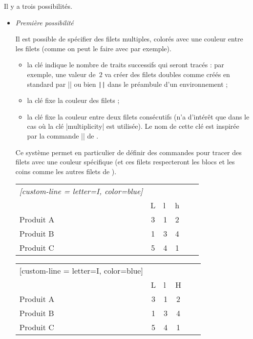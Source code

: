 \documentclass[dvipsnames]{article}%
\begin{document}
\bigskip
Il y a trois possibilités.


\begin{itemize}
\item \emph{Première possibilité}\par\nobreak

Il est possible de spécifier des filets multiples, colorés avec une couleur
entre les filets (comme on peut le faire avec  par exemple).

\begin{itemize}
\item la clé  indique le nombre de traits successifs
qui seront tracés : par exemple, une valeur de~$2$ va créer des filets doubles
comme créés en standard par |\hline\hline| ou bien \verb+||+ dans le préambule
d'un environnement ;

\item la clé  fixe la couleur des filets ;

\item la clé  fixe la couleur entre deux filets consécutifs (n'a
d'intérêt que dans le cas où la clé |multiplicity| est utilisée). Le nom de
cette clé est inspirée par la commande |\doublerulesepcolor| de .
\end{itemize}

\medskip
Ce système permet en particulier de définir des commandes pour tracer des filets
avec une couleur spécifique (et ces filets respecteront les blocs et les coins
comme les autres filets de ).

\medskip
\begin{Code}
\begin{NiceTabular}{lcIcIc}\emph{[custom-line = {letter=I, color=blue}]}
\hline
          &  \\
          & L & l & h \\
\hline
Produit A & 3 & 1 & 2 \\
Produit B & 1 & 3 & 4 \\
Produit C & 5 & 4 & 1 \\
\hline
\end{NiceTabular}
\end{Code}


\begin{center}
\begin{NiceTabular}{lcIcIc}[custom-line = {letter=I, color=blue}]
\hline
          &  \\
          & L & l & H \\
\hline
Produit A & 3 & 1 & 2 \\
Produit B & 1 & 3 & 4 \\
Produit C & 5 & 4 & 1 \\
\hline
\end{NiceTabular}
\end{center}



\end{itemize}
\end{document}
